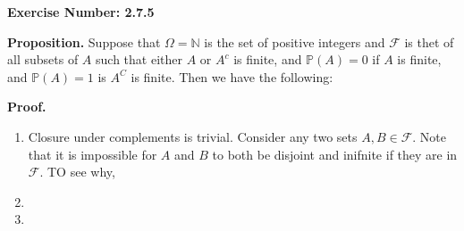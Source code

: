 \documentclass{article}
\begin{document}
\noindent \textbf{Exercise Number: 2.7.5}  %

\medskip 

\noindent \textbf{Proposition.} Suppose that $\Omega = \mathbb{N}$ is the set of positive integers 
and $\mathcal{F}$ is thet of all subsets of $A$ such that either $A$ or $A^c$ is finite, and 
$\mathbb{P}(A) = 0$ if $A$ is finite, and $\mathbb{P}(A) = 1$ is $A^C$ is finite. Then we have
the following:


\bigskip

\noindent \textbf{Proof.}  

\medskip

\begin{enumerate}

\item Closure under complements is trivial. Consider any two sets $A, B \in \mathcal{F}$. Note that it is impossible for $A$ and $B$ to both be disjoint and inifnite if they are in $\mathcal{F}$. TO see why, 

\item 

\item 

\end{enumerate}
\end{document}
